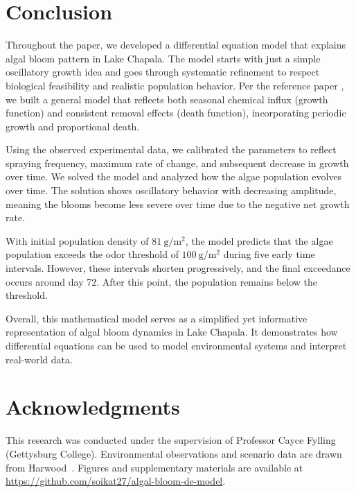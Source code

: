 \documentclass[11pt]{article}
\begin{document}
\section{Conclusion}

Throughout the paper, we developed a differential equation model that explains algal bloom pattern in Lake Chapala. The model starts with just a simple oscillatory growth idea and goes through systematic refinement to respect biological feasibility and realistic population behavior. Per the reference paper \cite{harwood-algae}, we built a general model that reflects both seasonal chemical influx (growth function) and consistent removal effects (death function), incorporating periodic growth and proportional death.

Using the observed experimental data, we calibrated the parameters to reflect spraying frequency, maximum rate of change, and subsequent decrease in growth over time. We solved the model and analyzed how the algae population evolves over time. The solution shows oscillatory behavior with decreasing amplitude, meaning the blooms become less severe over time due to the negative net growth rate.

With initial population density of $81~\mathrm{g/m^2}$, the model predicts that the algae population exceeds the odor threshold of $100~\mathrm{g/m^2}$ during five early time intervals. However, these intervals shorten progressively, and the final exceedance occurs around day 72. After this point, the population remains below the threshold.

Overall, this mathematical model serves as a simplified yet informative representation of algal bloom dynamics in Lake Chapala. It demonstrates how differential equations can be used to model environmental systems and interpret real-world data.

\section*{Acknowledgments}
This research was conducted under the supervision of Professor Cayce Fylling (Gettysburg College). Environmental observations and scenario data are drawn from Harwood~\cite{harwood-algae}. Figures and supplementary materials are available at \url{https://github.com/soikat27/algal-bloom-de-model}.



\end{document}
